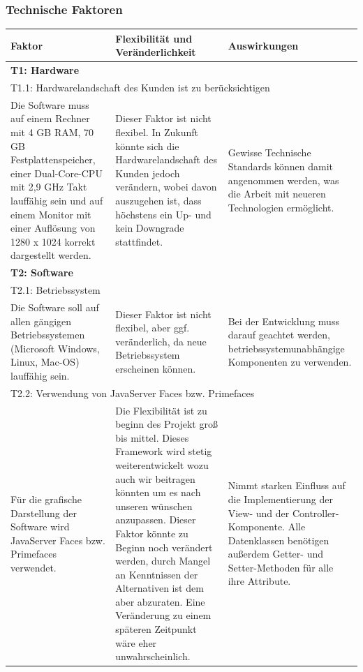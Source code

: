 \documentclass[fontsize=12pt,paper=a4,twoside]{scrartcl}
\begin{document}
\subsubsection{Technische Faktoren}

\begin{tabularx}{\textwidth}{|X|X|X|}
\hline
\textbf{Faktor} & \textbf{Flexibilität und Veränderlichkeit} & \textbf{Auswirkungen}\\\hline
\hline
\multicolumn{3}{|l|}{\textbf{T1: Hardware}}\\\hline
\multicolumn{3}{|l|}{T1.1: Hardwarelandschaft des Kunden ist zu berücksichtigen}\\\hline
Die Software muss auf einem Rechner mit 4 GB RAM, 70 GB Festplattenspeicher, einer Dual-Core-CPU mit 2,9 GHz Takt lauffähig sein und auf einem Monitor mit einer Auflösung von 1280 x 1024 korrekt dargestellt werden. & Dieser Faktor ist nicht flexibel. In Zukunft könnte sich die Hardwarelandschaft des Kunden jedoch verändern, wobei davon auszugehen ist, dass höchstens ein Up- und kein Downgrade stattfindet. & Gewisse Technische Standards können damit angenommen werden, was die Arbeit mit neueren Technologien ermöglicht. %
 \\\hline

\multicolumn{3}{|l|}{\textbf{T2: Software}}\\\hline
\multicolumn{3}{|l|}{T2.1: Betriebssystem}\\\hline
Die Software soll auf allen gängigen Betriebssystemen (Microsoft Windows, Linux, Mac-OS) lauffähig sein. & Dieser Faktor ist nicht flexibel, aber ggf. veränderlich, da neue Betriebssystem erscheinen können. & Bei der Entwicklung muss darauf geachtet werden, betriebssystemunabhängige Komponenten zu verwenden.\\\hline
\multicolumn{3}{|l|}{T2.2: Verwendung von JavaServer Faces bzw. Primefaces}\\\hline
Für die grafische Darstellung der Software wird JavaServer Faces bzw. Primefaces verwendet. &
Die Flexibilität ist zu beginn des Projekt groß bis mittel. Dieses Framework wird stetig weiterentwickelt wozu auch wir beitragen könnten um es nach unseren wünschen anzupassen.
 Dieser Faktor könnte zu Beginn noch verändert werden, durch Mangel an Kenntnissen der Alternativen ist dem aber abzuraten. Eine Veränderung zu einem späteren Zeitpunkt wäre eher unwahrscheinlich. & Nimmt starken Einfluss auf die Implementierung der View- und der Controller-Komponente. Alle Datenklassen benötigen außerdem Getter- und Setter-Methoden für alle ihre Attribute. \\\hline
\end{tabularx} \newpage
\end{document}
